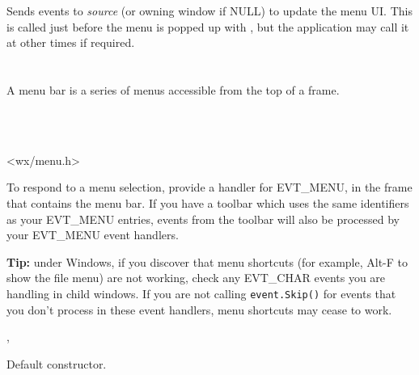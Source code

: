 Sends events to {\it source} (or owning window if NULL) to update the
menu UI. This is called just before the menu is popped up with , but
the application may call it at other times if required.



\section{}\label{wxmenubar}

A menu bar is a series of menus accessible from the top of a frame.


\\
\\


<wx/menu.h>


To respond to a menu selection, provide a handler for EVT\_MENU, in the frame
that contains the menu bar. If you have a toolbar which uses the same identifiers
as your EVT\_MENU entries, events from the toolbar will also be processed by your
EVT\_MENU event handlers.

{\bf Tip:} under Windows, if you discover that menu shortcuts (for example, Alt-F to show the file menu)
are not working, check any EVT\_CHAR events you are handling in child windows.
If you are not calling {\tt event.Skip()} for events that you don't process in these event handlers,
menu shortcuts may cease to work.


, 


\label{wxmenubarctor}


Default constructor.


